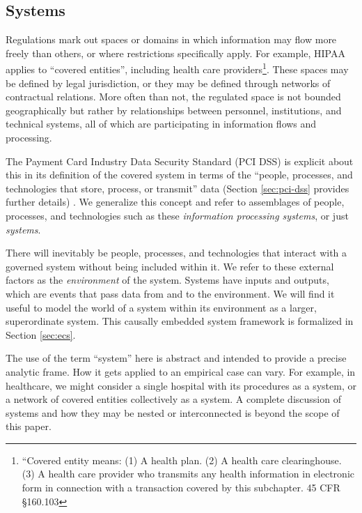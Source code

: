 \documentclass[../thesis.tex]{subfiles}
\begin{document}
\subsection{Systems}

Regulations mark out spaces or domains in which information 
may flow more freely than others, or where restrictions 
specifically apply.
For example, HIPAA applies to ``covered entities'', including 
health care providers\footnote{``Covered entity means: 
(1) A health plan. (2) A health care clearinghouse. 
(3) A health care provider who transmits any health 
information in electronic form in connection with a 
transaction covered by this subchapter. 45 CFR \S 160.103}.
These spaces may be defined by legal jurisdiction, or they 
may be defined through networks of contractual relations.
More often than not, the regulated space is not bounded 
geographically but rather by relationships between 
personnel, institutions, and technical systems,
all of which are participating in information flows 
and processing.

The Payment Card Industry Data Security Standard (PCI DSS) 
is explicit about this in its definition of the covered system 
in terms of the
``people, processes, and technologies that store, process, or
transmit'' data (Section \ref{sec:pci-dss} provides further details) \cite{pcisecuritystandardscouncil2016DSS}.
We generalize this concept and
refer to assemblages of people, processes, and technologies 
such as these \emph{information processing systems}, or 
just \emph{systems}.

There will inevitably be people, processes, and technologies
that interact with a governed system without being included
within it. We refer to these external factors as the
\emph{environment} of the system.
Systems have inputs and outputs, which are events
that pass data from and to the environment.
We will find it useful to model the world of a system
within its environment as a larger, superordinate system.
This causally embedded system framework is formalized
in Section \ref{sec:ecs}.

The use of the term ``system'' here is abstract and intended
to provide a precise analytic frame.
How it gets applied to an empirical case can vary.
For example, in healthcare, we might consider a single hospital
with its procedures as a system, or a network of covered entities
collectively as a system.
A complete discussion of systems and how they may be nested or
interconnected is beyond the scope of this paper.
\end{document}
